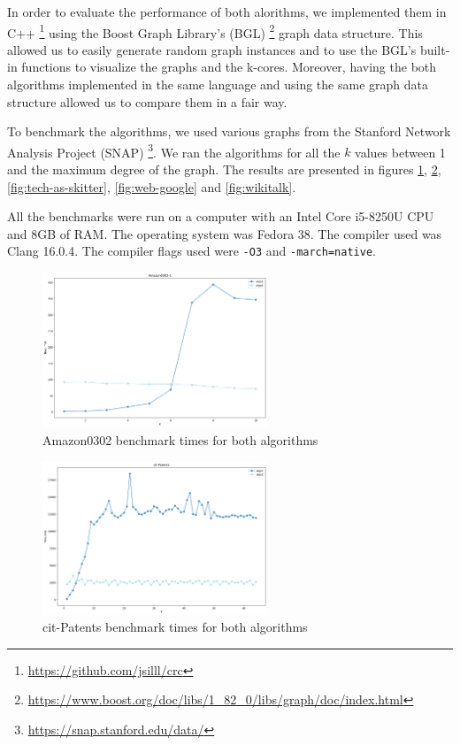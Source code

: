\label{Evaluation}

In order to evaluate the performance of both alorithms, we implemented them in C++ \footnote{\url{https://github.com/jsilll/crc}} using the Boost Graph Library's (BGL) \footnote{\url{https://www.boost.org/doc/libs/1_82_0/libs/graph/doc/index.html}} graph data structure. This allowed us to easily generate random graph instances and to use the BGL's built-in functions to visualize the graphs and the k-cores. Moreover, having the both algorithms implemented in the same language and using the same graph data structure allowed us to compare them in a fair way.

To benchmark the algorithms, we used various graphs from the Stanford Network Analysis Project (SNAP) \footnote{\url{https://snap.stanford.edu/data/}}. We ran the algorithms for all the $k$ values between 1 and the maximum degree of the graph. The results are presented in figures \ref{fig:amazon}, \ref{fig:cit-patents}, \ref{fig:tech-as-skitter}, \ref{fig:web-google} and \ref{fig:wikitalk}.

All the benchmarks were run on a computer with an Intel Core i5-8250U CPU and 8GB of RAM. The operating system was Fedora 38. The compiler used was Clang 16.0.4. The compiler flags used were \texttt{-O3} and \texttt{-march=native}.

\begin{figure}[H]
    \centering
    \includegraphics[width=0.6\textwidth]{Figures/Amazon0302-1.png}
    \caption{Amazon0302 benchmark times for both algorithms}
    \label{fig:amazon}
\end{figure}

\begin{figure}[H]
    \centering
    \includegraphics[width=0.6\textwidth]{Figures/cit-Patents.png}
    \caption{cit-Patents benchmark times for both algorithms}
    \label{fig:cit-patents}
\end{figure}

